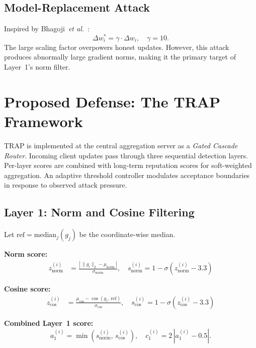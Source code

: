 \documentclass[journal]{IEEEtran}
\newcommand{\sysname}{TRAP}
\newcommand{\etal}{\textit{et al.}}
\begin{document}
\subsection{Model-Replacement Attack}
Inspired by Bhagoji~\etal~\cite{bhagoji2019analyzing}:
\begin{equation}
  \Delta w_i^* = \gamma \cdot \Delta w_i, \quad \gamma = 10.
\end{equation}
The large scaling factor overpowers honest updates. However, this attack
produces abnormally large gradient norms, making it the primary target of
Layer~1's norm filter.

\section{Proposed Defense: The \sysname{} Framework}

\sysname{} is implemented at the central aggregation server as a
\emph{Gated Cascade Router}. Incoming client updates pass through three
sequential detection layers. Per-layer scores are combined with long-term
reputation scores for soft-weighted aggregation. An adaptive threshold
controller modulates acceptance boundaries in response to observed attack
pressure.

\subsection{Layer 1: Norm and Cosine Filtering}
Let $\mathrm{ref} = \mathrm{median}_j(g_j)$ be the coordinate-wise median.

\textbf{Norm score:}
\begin{align}
  z_{\mathrm{norm}}^{(i)} &= \frac{|\,\|g_i\|_2 - \mu_{\mathrm{norm}}\,|}{\sigma_{\mathrm{norm}}}, \quad
  s_{\mathrm{norm}}^{(i)} = 1 - \sigma(z_{\mathrm{norm}}^{(i)} - 3.3)
\end{align}

\textbf{Cosine score:}
\begin{align}
  z_{\mathrm{cos}}^{(i)} &= \frac{\mu_{\mathrm{cos}} - \cos(g_i,\,\mathrm{ref})}{\sigma_{\mathrm{cos}}}, \quad
  s_{\mathrm{cos}}^{(i)} = 1 - \sigma(z_{\mathrm{cos}}^{(i)} - 3.3)
\end{align}

\textbf{Combined Layer~1 score:}
\begin{equation}
  a_1^{(i)} = \min(s_{\mathrm{norm}}^{(i)},\, s_{\mathrm{cos}}^{(i)}), \quad
  c_1^{(i)} = 2\,|a_1^{(i)} - 0.5|.
\end{equation}
\end{document}
